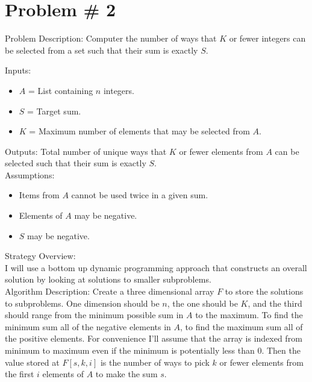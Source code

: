\documentclass{article}
\begin{document}
\section*{Problem \# 2}
Problem Description: Computer the number of ways that $K$ or fewer integers can be selected from a set such that their sum is exactly $S$.

Inputs:
\begin{itemize}
    \item $A$ = List containing $n$ integers.
    \item $S$ = Target sum.
    \item $K$ = Maximum number of elements that may be selected from $A$. 
\end{itemize}

Outputs: Total number of unique ways that $K$ or fewer elements from $A$ can be selected such that their sum is exactly $S$. \\

Assumptions:
\begin{itemize}
    \item Items from $A$ cannot be used twice in a given sum.
    \item Elements of $A$ may be negative.
    \item $S$ may be negative.
\end{itemize}

Strategy Overview:\\
I will use a bottom up dynamic programming approach that constructs an overall solution by looking at solutions to smaller subproblems.\\

Algorithm Description:
Create a three dimensional array $F$ to store the solutions to subproblems. One dimension should be $n$, the one should be $K$, and the third should range from the minimum possible sum in $A$ to the maximum. To find the minimum sum all of the negative elements in $A$, to find the maximum sum all of the positive elements. For convenience I'll assume that the array is indexed from minimum to maximum even if the minimum is potentially less than 0. Then the value stored at $F[s, k, i]$ is the number of ways to pick $k$ or fewer elements from the first $i$ elements of $A$ to make the sum $s$. \\
\end{document}

